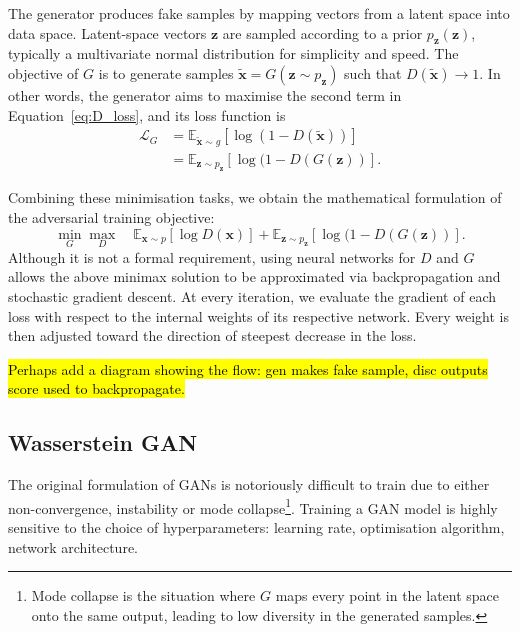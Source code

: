 The generator produces fake samples by mapping vectors from a latent space into
data space. Latent-space vectors $\bm{z}$ are sampled according to a prior
$p_{\bm{z}}(\bm{z})$, typically a multivariate normal distribution for
simplicity and speed. The objective of $G$ is to generate samples
$\tilde{\bm{x}} = G(\bm{z} \sim p_{\bm{z}})$ such that
$D(\tilde{\bm{x}}) \rightarrow 1$. In other words, the generator aims to
maximise the second term in Equation~\ref{eq:D_loss}, and its loss function is
\begin{align}\label{eq:GAN_gen}
    \mathcal{L}_G & =
    \mathbb{E}_{\tilde{\bm{x}} \sim g} [ \log( 1 - D(\tilde{\bm{x}}) )]\nonumber        \\
                  & = \mathbb{E}_{\bm{z} \sim p_{\bm{z}}} [ \log( 1 - D(G(\bm{z}) )].
\end{align}

Combining these minimisation tasks, we obtain the mathematical formulation of
the adversarial training objective:
\begin{equation}\label{eq:GAN}
    \min_G \max_D \quad
    \mathbb{E}_{\bm{x} \sim p} [ \log D(\bm{x}) ] +
    \mathbb{E}_{\bm{z} \sim p_{\bm{z}}} [ \log( 1 - D(G(\bm{z}) )].
\end{equation}
Although it is not a formal requirement, using neural networks for $D$ and $G$
allows the above minimax solution to be approximated via backpropagation and
stochastic gradient descent. At every iteration, we evaluate the gradient of
each loss with respect to the internal weights of its respective network. Every
weight is then adjusted toward the direction of steepest decrease in the loss.

\hl{ Perhaps add a diagram showing the flow: gen makes fake sample, disc outputs
    score used to backpropagate. }

\subsection{Wasserstein GAN}
The original formulation of GANs is notoriously difficult to train due to either
non-convergence, instability or mode collapse\footnote{Mode collapse is the
situation where $G$ maps every point in the latent space onto the same output,
leading to low diversity in the generated samples.}. Training a GAN model is
highly sensitive to the choice of hyperparameters: learning rate, optimisation
algorithm, network architecture.

